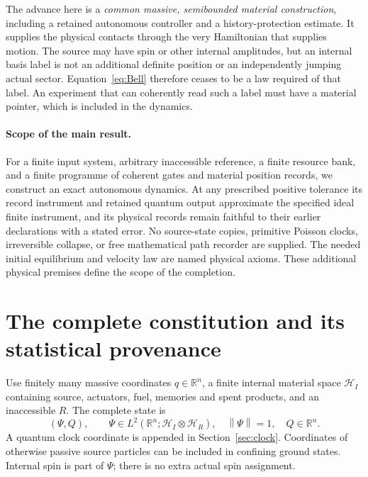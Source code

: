 \documentclass[11pt]{article}
\theoremstyle{definition}\newtheorem{assumption}[theorem]{Constitutive assumption}
\theoremstyle{remark}\newtheorem{remark}[theorem]{Remark}
\newcommand{\cH}{\mathcal H}\newcommand{\cS}{\mathcal S}
\newcommand{\norm}[1]{\left\|#1\right\|}\newcommand{\pos}[1]{[#1]_+}
\begin{document}
The advance here is a \emph{common massive, semibounded material construction}, including a retained autonomous controller and a history-protection estimate. It supplies the physical contacts through the very Hamiltonian that supplies motion. The source may have spin or other internal amplitudes, but an internal basis label is not an additional definite position or an independently jumping actual sector. Equation~\eqref{eq:Bell} therefore ceases to be a law required of that label. An experiment that can coherently read such a label must have a material pointer, which is included in the dynamics.

\paragraph{Scope of the main result.}
For a finite input system, arbitrary inaccessible reference, a finite resource bank, and a finite programme of coherent gates and material position records, we construct an exact autonomous dynamics. At any prescribed positive tolerance its record instrument and retained quantum output approximate the specified ideal finite instrument, and its physical records remain faithful to their earlier declarations with a stated error. No source-state copies, primitive Poisson clocks, irreversible collapse, or free mathematical path recorder are supplied. The needed initial equilibrium and velocity law are named physical axioms. These additional physical premises define the scope of the completion.

\section{The complete constitution and its statistical provenance}
\label{sec:constitution}
Use finitely many massive coordinates $q\in\mathbb R^n$, a finite internal material space $\cH_I$ containing source, actuators, fuel, memories and spent products, and an inaccessible $R$. The complete state is
\begin{equation}\label{eq:state}
 (\Psi,Q),\qquad \Psi\in L^2(\mathbb R^n;\cH_I\otimes\cH_R),\quad
 \norm{\Psi}=1,\quad Q\in\mathbb R^n.
\end{equation}
A quantum clock coordinate is appended in Section~\ref{sec:clock}. Coordinates of otherwise passive source particles can be included in confining ground states. Internal spin is part of $\Psi$; there is no extra actual spin assignment.
\end{document}
